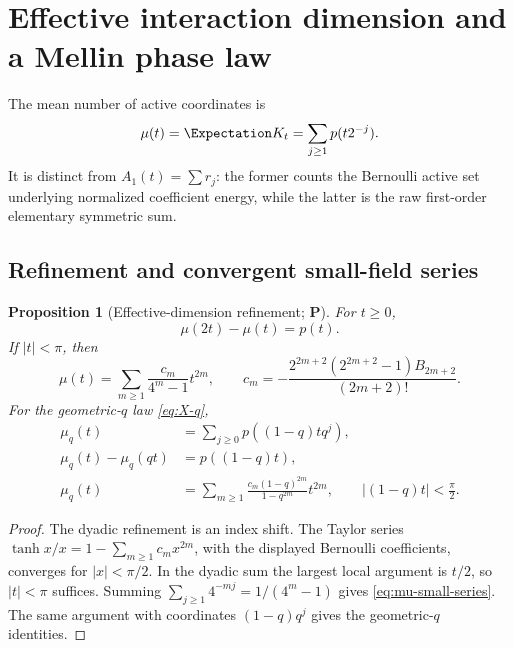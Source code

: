 \documentclass[11pt,oneside]{article}
\newtheorem{proposition}[theorem]{Proposition}
\theoremstyle{definition}
\theoremstyle{remark}
\newcommand{\statusP}{\textcolor{deepgreen}{\textbf{P}}}
\begin{document}
\section{Effective interaction dimension and a Mellin phase law}
\label{sec:effective-dimension}

The mean number of active coordinates is
\begin{equation}
 \mu(t)=\Expectation K_t=\sum_{j\ge1}p(t2^{-j}).
 \label{eq:mu-def}
\end{equation}
It is distinct from $A_1(t)=\sum r_j$: the former counts the Bernoulli active
set underlying normalized coefficient energy, while the latter is the raw
first-order elementary symmetric sum.

\subsection{Refinement and convergent small-field series}

\begin{proposition}[Effective-dimension refinement; \statusP]
\label{prop:mu-refinement}
For $t\ge0$,
\begin{equation}
 \boxed{\mu(2t)-\mu(t)=p(t).}
 \label{eq:mu-refinement}
\end{equation}
If $|t|<\pi$, then
\begin{equation}
 \boxed{
 \mu(t)=\sum_{m\ge1}\frac{c_m}{4^m-1}t^{2m},
 \qquad
 c_m=-\frac{2^{2m+2}(2^{2m+2}-1)B_{2m+2}}{(2m+2)!}.}
 \label{eq:mu-small-series}
\end{equation}
For the geometric-$q$ law \eqref{eq:X-q},
\begin{align}
 \mu_q(t)&=\sum_{j\ge0}p((1-q)tq^j),
 \label{eq:mu-q-def}\\
 \mu_q(t)-\mu_q(qt)&=p((1-q)t),
 \label{eq:mu-q-refinement}\\
 \mu_q(t)&=\sum_{m\ge1}
 \frac{c_m(1-q)^{2m}}{1-q^{2m}}t^{2m},
 \qquad |(1-q)t|<\frac\pi2.
 \label{eq:mu-q-series}
\end{align}
\end{proposition}

\begin{proof}
The dyadic refinement is an index shift.  The Taylor series
$\tanh x/x=1-\sum_{m\ge1}c_mx^{2m}$, with the displayed Bernoulli
coefficients, converges for $|x|<\pi/2$.  In the dyadic sum the largest local
argument is $t/2$, so $|t|<\pi$ suffices.  Summing
$\sum_{j\ge1}4^{-mj}=1/(4^m-1)$ gives \eqref{eq:mu-small-series}.  The same
argument with coordinates $(1-q)q^j$ gives the geometric-$q$ identities.
\end{proof}
\end{document}

